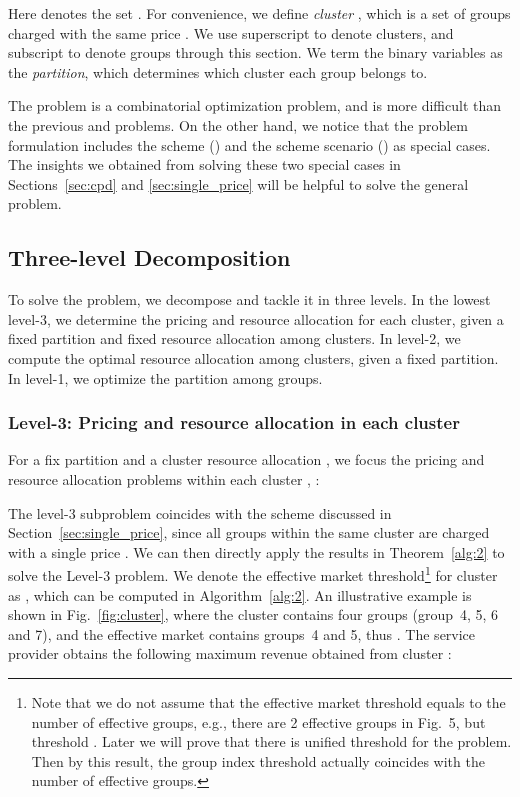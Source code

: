 \documentclass[twocolumn,10pt,twosided]{IEEEtran}
\begin{document}
Here  denotes the set .   For convenience, we define \emph{cluster}  ,  which is a set of groups charged with the same price .  We use superscript  to denote clusters, and subscript  to denote groups through this section. We term the binary variables  as the \emph{partition}, which determines which cluster each group belongs to.

The  problem is a combinatorial optimization problem, and is more difficult than  the previous  and  problems.
On the other hand, we notice that the  problem formulation includes the  scheme () and the  scheme scenario () as special cases. The insights we obtained from solving these two special cases in Sections~\ref{sec:cpd} and \ref{sec:single_price} will be helpful to solve the general  problem.

\subsection{Three-level Decomposition}
To solve the  problem, we decompose and tackle it in three levels. In the lowest level-3, we determine the pricing and resource allocation for each cluster, given a fixed partition and fixed resource allocation among clusters. In level-2, we compute the optimal resource allocation among clusters, given a fixed partition. In level-1, we optimize the partition among groups.
\subsubsection{Level-3: Pricing and resource allocation in each cluster}
 For a fix partition  and a cluster resource allocation , we focus the pricing and resource allocation
problems within each cluster , :

The level-3 subproblem coincides with the  scheme  discussed in Section~\ref{sec:single_price}, since all groups within the same cluster  are charged with a single price . We can then directly apply the results in Theorem~\ref{alg:2} to solve the Level-3 problem. We denote the effective market threshold\footnote{Note that we do not assume that the effective market threshold equals to the number of effective groups, e.g., there are 2 effective groups in Fig.~5, but threshold . Later we will prove that there is unified threshold for the  problem. Then by this result, the group index threshold actually coincides with the number of effective groups.} for cluster   as , which can be computed in Algorithm~\ref{alg:2}. An illustrative  example is shown in Fig.~\ref{fig:cluster}, where the cluster contains four groups (group~4, 5, 6 and 7), and the effective market contains groups~4 and 5, thus . The service provider obtains the following maximum revenue obtained from cluster :
\end{document}
